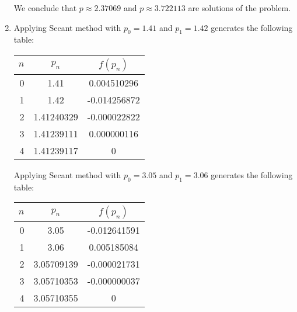 \documentclass[../../../../Assignments]{subfiles}
\begin{document}
\begin{solution}
\begin{enumerate}[label = \alph*)]
            We conclude that \(p \approx \num{2.37069}\) and \(p \approx
            \num{3.722113}\) are solutions of the problem.

        \item Applying Secant method with \(p_0 = \num{1.41}\) and \(p_1 =
            \num{1.42}\) generates the following table:

            \begin{table}[H]
                \centering
                \begin{tabular}{r S[table-format=1.8] S[table-format=-1.9]}
                    \toprule
                    \(n\)  &   {\(p_n\)}   &  {\(f(p_n)\)}  \\
                      &  1.41         &   0.004510296  \\
                        1  &  1.42         &  -0.014256872  \\
                        2  &  1.41240329   &  -0.000022822  \\
                        3  &  1.41239111   &   0.000000116  \\
                        4  &  1.41239117   &   0            \\
                    \bottomrule
                \end{tabular}
            \end{table}

            Applying Secant method with \(p_0 = \num{3.05}\) and \(p_1 =
            \num{3.06}\) generates the following table:

            \begin{table}[H]
                \centering
                \begin{tabular}{r S[table-format=1.8] S[table-format=-1.9]}
                    \toprule
                    \(n\)  &   {\(p_n\)}   &  {\(f(p_n)\)}  \\
                      &  3.05         &  -0.012641591  \\
                        1  &  3.06         &   0.005185084  \\
                        2  &  3.05709139   &  -0.000021731  \\
                        3  &  3.05710353   &  -0.000000037  \\
                        4  &  3.05710355   &   0            \\
                    \bottomrule
                \end{tabular}
            \end{table}


\end{enumerate}
\end{solution}
\end{document}
